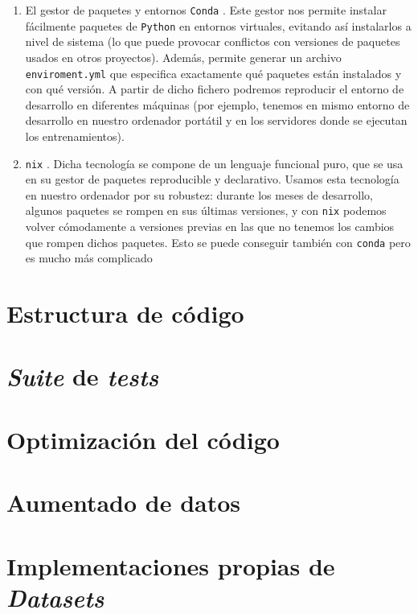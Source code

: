 \begin{enumerate}
    \item El gestor de paquetes y entornos \lstinline{Conda} \cite{informatica:conda_web}. Este gestor nos permite instalar fácilmente paquetes de \lstinline{Python} en entornos virtuales, evitando así instalarlos a nivel de sistema (lo que puede provocar conflictos con versiones de paquetes usados en otros proyectos). Además, permite generar un archivo \lstinline{enviroment.yml} que especifica exactamente qué paquetes están instalados y con qué versión. A partir de dicho fichero podremos reproducir el entorno de desarrollo en diferentes máquinas (por ejemplo, tenemos en mismo entorno de desarrollo en nuestro ordenador portátil y en los servidores donde se ejecutan los entrenamientos).
    \item \lstinline{nix} \cite{informatica:nixos_web}. Dicha tecnología se compone de un lenguaje funcional puro, que se usa en su gestor de paquetes reproducible y declarativo. Usamos esta tecnología en nuestro ordenador por su robustez: durante los meses de desarrollo, algunos paquetes se rompen en sus últimas versiones, y con \lstinline{nix} podemos volver cómodamente a versiones previas en las que no tenemos los cambios que rompen dichos paquetes. Esto se puede conseguir también con \lstinline{conda} pero es mucho más complicado
\end{enumerate}


\section{Estructura de código}



\section{\textit{Suite} de \textit{tests}} \label{isec:test_suite}

\section{Optimización del código} \label{isec:optimizacion_codigo}

\section{Aumentado de datos} \label{isec:aumentado_datos}

\section{Implementaciones propias de \textit{Datasets}} \label{isec:datasets_customs}

